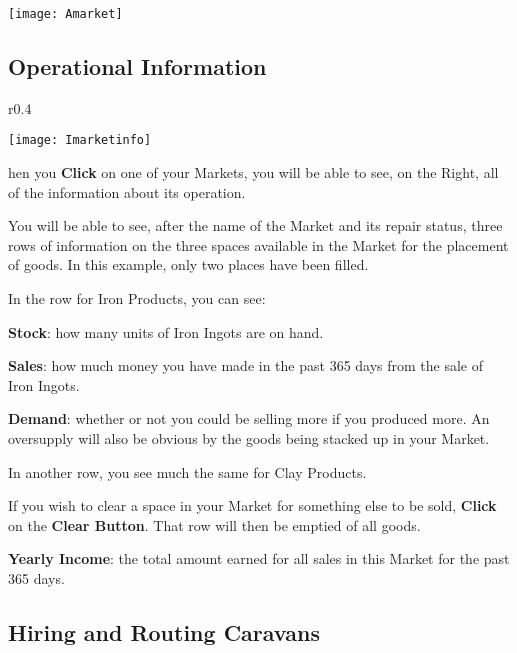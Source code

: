 \begin{center}
    \texttt{[image: Amarket]} %
\end{center}

\subsection{\textsf{Operational Information}}


\begin{wrapfigure}{r}{0.4\textwidth}
    \vspace{-20pt}
    \begin{center}
        \texttt{[image: Imarketinfo]} %
    \end{center}
    \vspace{-20pt}
\end{wrapfigure}

hen you \textbf{Click} on one of your Markets, you will be able to see, on the Right, all of the information about its operation.

You will be able to see, after the name of the Market and its repair status, three rows of information on the three spaces available in the Market for the placement of goods. In this example, only two places have been filled.

In the row for Iron Products, you can see:

\textbf{Stock}: how many units of Iron Ingots are on hand.

\textbf{Sales}: how much money you have made in the past 365 days from the sale of Iron Ingots.

\textbf{Demand}: whether or not you could be selling more if you produced more. An oversupply will also be obvious by the goods being stacked up in your Market.

In another row, you see much the same for Clay Products.

If you wish to clear a space in your Market for something else to be sold, \textbf{Click} on the \textbf{Clear Button}. That row will then be emptied of all goods.

\textbf{Yearly Income}: the total amount earned for all sales in this Market for the past 365 days.

\subsection{\textsf{Hiring and Routing Caravans}}

